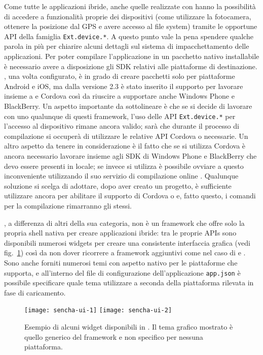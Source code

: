 			Come tutte le applicazioni ibride, anche quelle realizzate con
			\senchat{} hanno la possibilità di accedere a funzionalità proprie
			dei dispositivi (come utilizzare la fotocamera, ottenere la posizione
			dal GPS e avere accesso al file sys\-tem) tramite le opportune API
			della famiglia \verb|Ext.device.*|. A questo punto vale la pena
			spendere qualche parola in più per chiarire alcuni dettagli sul
			sistema di impacchettamento delle applicazioni. Per poter compilare
			l'applicazione in un pacchetto nativo installabile è necessario
			avere a disposizione gli SDK relativi alle piattaforme di destinazione.
			\senchacmd{}, una volta configurato, è in grado di creare pacchetti
			solo per piattaforme Android e iOS, ma dalla versione 2.3 è stato
			inserito il supporto per lavorare insieme a \pg{} e Cordova così da
			riuscire a supportare anche Windows Phone e BlackBerry. Un aspetto
			importante da sottolineare è che se si decide di lavorare con uno
			qualunque di questi framework, l'uso delle API \verb|Ext.device.*| per
			l'accesso al dispositivo rimane ancora valido; sarà \senchacmd{} che
			durante il processo di compilazione si occuperà di utilizzare le
			relative API Cordova o \pg{} necessarie. Un altro aspetto da
			tenere in considerazione è il fatto che se si utilizza Cordova è
			ancora necessario lavorare insieme agli SDK di Windows Phone e BlackBerry
			che devo essere presenti in locale; se invece si utilizza \pg{} è
			possibile ovviare a questo inconveniente utilizzando il suo servizio
			di compilazione online \pgb{}. Qualunque soluzione si scelga di
			adottare, dopo aver creato un progetto, è sufficiente utilizzare
			ancora \senchacmd{} per abilitare il supporto di Cordova o \pg{} e,
			fatto questo, i comandi per la compilazione rimarranno gli stessi.
			
			\senchat{}, a differenza di altri della sua categoria, non è un
			framework che offre	solo la propria shell nativa per creare
			applicazioni ibride: tra le	proprie APIs sono disponibili numerosi
			widgets per creare una consistente interfaccia grafica
			(vedi fig.~\ref{fig:senchaui}) così da non dover ricorrere a
			framework aggiuntivi come nel caso di \pg{} e \rhom{}. Sono anche
			forniti numerosi temi con aspetto nativo per le piattaforme che
			supporta, e all'interno del file di configurazione dell'applicazione
			\verb|app.json| è possibile specificare quale tema utilizzare a
			seconda della piattaforma rilevata in fase di caricamento.
			\begin{figure}[h]
				\centering
				\texttt{[image: sencha-ui-1]}
				\texttt{[image: sencha-ui-2]}
				\label{fig:senchaui}
				\caption{
					Esempio di alcuni widget disponibili in \senchat{}.
					Il tema grafico mostrato è quello generico del framework e
					non specifico per nessuna piattaforma.
				}
			\end{figure}
				

